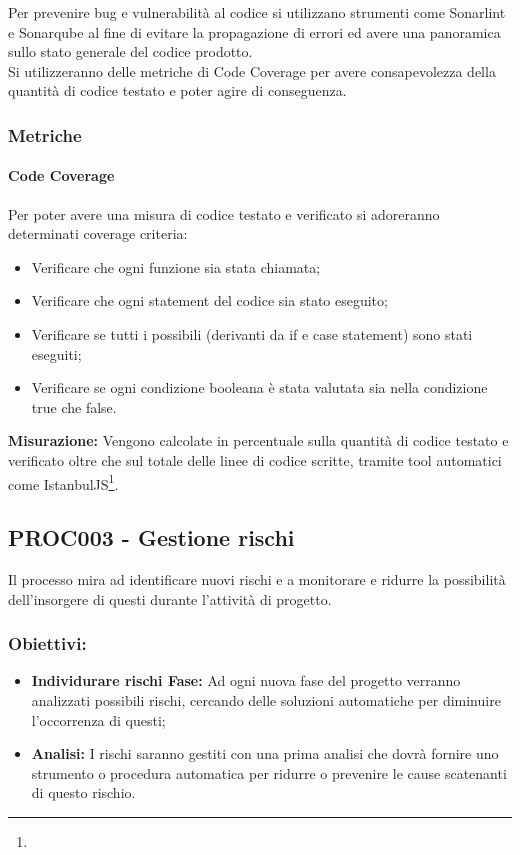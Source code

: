 \documentclass[NormeDiProgetto.tex]{subfiles}
\begin{document}
	Per prevenire bug e vulnerabilità al codice si utilizzano strumenti come Sonarlint e Sonarqube al fine di evitare la propagazione di errori ed avere una panoramica sullo stato generale del codice prodotto.\\
	Si utilizzeranno delle metriche di Code Coverage per avere consapevolezza della quantità di codice testato e poter agire di conseguenza.
	
	\subsubsection{Metriche}
	\paragraph{Code Coverage}
	Per poter avere una misura di codice testato e verificato si adoreranno determinati coverage criteria:
	
	\begin{itemize}
		\item {} Verificare che ogni funzione sia stata chiamata;
		\item {} Verificare che ogni statement del codice sia stato eseguito; 
		\item {} Verificare se tutti i possibili  (derivanti da if e case statement) sono stati eseguiti;
		\item {} Verificare se ogni condizione booleana è stata valutata sia nella condizione true che false. 
		
	\end{itemize}
	\textbf{Misurazione:}
	Vengono calcolate in percentuale sulla quantità di codice testato e verificato oltre che sul totale delle linee di codice scritte, tramite tool automatici come IstanbulJS\footnote{}.
	
	\subsection{PROC003 - Gestione rischi}
	Il processo mira ad identificare nuovi rischi e a monitorare e ridurre la possibilità dell'insorgere di questi durante l'attività di progetto.
	\subsubsection{Obiettivi:}
	\begin{itemize}
		\item \textbf{Individurare rischi Fase:} Ad ogni nuova fase del progetto verranno analizzati possibili rischi, cercando delle soluzioni automatiche per diminuire l'occorrenza di questi;
		\item \textbf{Analisi:} I rischi saranno gestiti con una prima analisi che dovrà fornire uno strumento o procedura automatica per ridurre o prevenire le cause scatenanti di questo rischio.
	\end{itemize}
\end{document}
